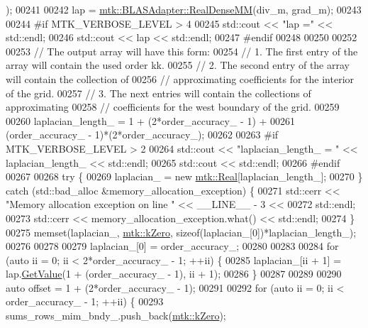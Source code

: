 \begin{DoxyCode}
      );
00241 
00242   lap = \hyperlink{classmtk_1_1BLASAdapter_acebd0e9bfe0bdd609c7fbea98ccfd3b5}{mtk::BLASAdapter::RealDenseMM}(div\_m, grad\_m);
00243 
00244 \textcolor{preprocessor}{  #if MTK\_VERBOSE\_LEVEL > 4}
00245   std::cout << \textcolor{stringliteral}{"lap ="} << std::endl;
00246   std::cout << lap << std::endl;
00247 \textcolor{preprocessor}{  #endif}
00248 
00250 
00252 
00253   \textcolor{comment}{// The output array will have this form:}
00254   \textcolor{comment}{// 1. The first entry of the array will contain the used order kk.}
00255   \textcolor{comment}{// 2. The second entry of the array will contain the collection of}
00256   \textcolor{comment}{// approximating coefficients for the interior of the grid.}
00257   \textcolor{comment}{// 3. The next entries will contain the collections of approximating}
00258   \textcolor{comment}{// coefficients for the west boundary of the grid.}
00259 
00260   laplacian\_length\_ = 1 + (2*order\_accuracy\_ - 1) +
00261     (order\_accuracy\_ - 1)*(2*order\_accuracy\_);
00262 
00263 \textcolor{preprocessor}{  #if MTK\_VERBOSE\_LEVEL > 2}
00264   std::cout << \textcolor{stringliteral}{"laplacian\_length\_ = "} << laplacian\_length\_ << std::endl;
00265   std::cout << std::endl;
00266 \textcolor{preprocessor}{  #endif}
00267 
00268   \textcolor{keywordflow}{try} \{
00269     laplacian\_ = \textcolor{keyword}{new} \hyperlink{group__c01-roots_gac080bbbf5cbb5502c9f00405f894857d}{mtk::Real}[laplacian\_length\_];
00270   \} \textcolor{keywordflow}{catch} (std::bad\_alloc &memory\_allocation\_exception) \{
00271     std::cerr << \textcolor{stringliteral}{"Memory allocation exception on line "} << \_\_LINE\_\_ - 3 <<
00272       std::endl;
00273     std::cerr << memory\_allocation\_exception.what() << std::endl;
00274   \}
00275   memset(laplacian\_, \hyperlink{group__c01-roots_ga59a451a5fae30d59649bcda274fea271}{mtk::kZero}, \textcolor{keyword}{sizeof}(laplacian\_[0])*laplacian\_length\_);
00276 
00278 
00279   laplacian\_[0] = order\_accuracy\_;
00280 
00283 
00284   \textcolor{keywordflow}{for} (\textcolor{keyword}{auto} ii = 0; ii < 2*order\_accuracy\_ - 1; ++ii) \{
00285     laplacian\_[ii + 1] = lap.\hyperlink{classmtk_1_1DenseMatrix_a4b23ecbebd970b5eea915dbb50691024}{GetValue}(1 + (order\_accuracy\_ - 1), ii + 1);
00286   \}
00287 
00289 
00290   \textcolor{keyword}{auto} offset = 1 + (2*order\_accuracy\_ - 1);
00291 
00292   \textcolor{keywordflow}{for} (\textcolor{keyword}{auto} ii = 0; ii < order\_accuracy\_ - 1; ++ii) \{
00293     sums\_rows\_mim\_bndy\_.push\_back(\hyperlink{group__c01-roots_ga59a451a5fae30d59649bcda274fea271}{mtk::kZero});

\end{DoxyCode}
